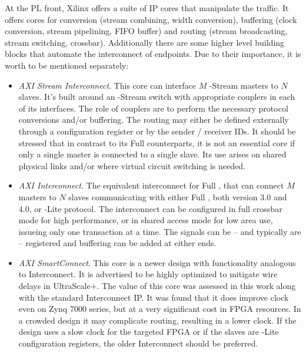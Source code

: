 At the PL front, Xilinx offers a suite of IP cores that manipulate the  traffic.
It offers cores for conversion (stream combining, width conversion), buffering (clock conversion,
stream pipelining, FIFO buffer) and routing (stream broadcasting, stream switching,  crossbar).
Additionally there are some higher level  building blocks that automate the interconnect of
 endpoints. Due to their importance, it is worth to be mentioned separately:

\begin{itemize}
\item	\textit{AXI Stream Interconnect}. This core can interface $M$ -Stream masters to $N$ slaves.
	It's built around an -Stream switch with appropriate couplers in each of its interfaces.
	The role of couplers are to perform the necessary protocol conversions and/or buffering.
	The routing may either be defined externally through a configuration register or by
	the sender / receiver IDs. It should be stressed that in contrast to its Full 
	counterparts, it is not an essential core if only a single master is connected to a single slave.
	Its use arises on shared physical links and/or where virtual circuit switching is needed.
\item	\textit{AXI Interconnect}. The equivalent interconnect for Full , that can connect $M$ masters
	to $N$ slaves communicating with either Full , both version 3.0 and 4.0, or -Lite protocol.
	The interconnect can be configured in full crossbar mode for high performance,
	or in shared access mode for low area use, issueing only one transaction at a time.
	The signals can be -- and typically are -- registered and buffering can be added at either ends.
\item	\textit{AXI SmartConnect}. This core is a newer design with functionality analogous to  Interconnect.
	It is advertised to be highly optimized to mitigate wire delays in UltraScale+.
	The value of this core was assessed in this work along with the standard  Interconnect IP.
	It was found that it does improve clock even on Zynq 7000 series, but at a very significant cost
	in FPGA resources. In a crowded design it may complicate routing, resulting in a lower clock.
	If the design uses a slow clock for the targeted FPGA or 
	if the slaves are -Lite configuration registers,
	the older  Interconnect should be preferred.
\end{itemize}

